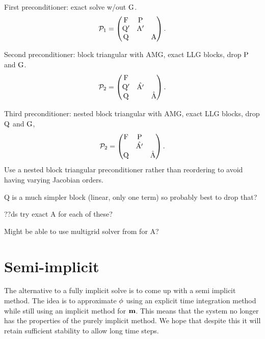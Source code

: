 \newcommand{\prcd}{\mathcal{P}}

First preconditioner: exact solve w/out ${\mathbf{\mathrm{G}}}$.
\begin{equation}
  \prcd_{1} = 
  \begin{pmatrix}
    \Fm       & \Pm     &  \\
    \Qm'       & \Am'    &   \\
    \Qm       &         &   \Am
  \end{pmatrix}.
\end{equation}

Second preconditioner: block triangular with AMG, exact LLG blocks, drop $\mathrm{P}$ and ${\mathbf{\mathrm{G}}}$.
\begin{equation}
  \prcd_{2} = 
  \begin{pmatrix}
    \Fm       &           &  \\
    \Qm'       & \hat{\Am'}&   \\
    \Qm       &           &   \hat{\Am}
  \end{pmatrix}.
\end{equation}

Third preconditioner: nested block triangular with AMG, exact LLG blocks, drop $\mathrm{Q}$ and ${\mathbf{\mathrm{G}}}$,
\begin{equation}
  \prcd_{2} = 
  \begin{pmatrix}
    \Fm       & \Pm       &  \\
    & \hat{\Am'}&   \\
    \Qm       &           &   \hat{\Am}
  \end{pmatrix}.
\end{equation}
Use a nested block triangular preconditioner rather than reordering to avoid having varying Jacobian orders.

Q is a much simpler block (linear, only one term) so probably best to drop that?

??ds try exact A for each of these?

Might be able to use multigrid solver from \cite[B71]{Banas2013} for A?


\section{Semi-implicit}
\label{sec:semi-implicit-bem}

The alternative to a fully implicit solve is to come up with a semi implicit method.
The idea is to approximate $\phi$ using an explicit time integration method while still using an implicit method for $\mathbf{m}$.
This means that the system no longer has the properties of the purely implicit method.
We hope that despite this it will retain sufficient stability to allow long time steps.

